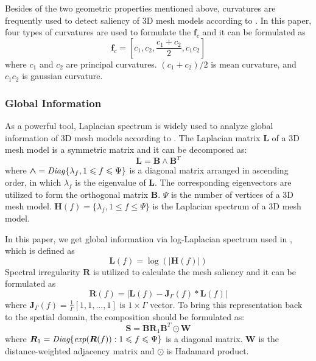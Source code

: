 \documentclass[runningheads]{article}
\begin{document}
Besides of the two geometric properties mentioned above, curvatures \cite{Curvatures} are frequently used to detect saliency of 3D mesh models according to \cite{Meshsaliency2005mesh,akagunduz2009scale,LSP20073d,randomforest20143d,machine3dkeypoint2013machine}. In this paper, four types of curvatures are used to formulate the \emph{$\bm{f}_c$} and it can be formulated as
\begin{equation}
	\bm{f}_c = [c_1,c_2,\frac{c_1+c_2}{2},c_1c_2]
\end{equation}
where \emph{$c_1$} and \emph{$c_2$} are principal curvatures. \emph{$(c_1+c_2)/2$} is mean curvature, and \emph{$c_1c_2$} is gaussian curvature.

\subsubsection{Global Information}
As a powerful tool, Laplacian spectrum is widely used to analyze global information of 3D mesh models according to \cite{hu2009salient,song20133d,song2014mesh,Pauly,Levy:2010:SMP:1837101.1837109,Zhang:2012:VMD:2167076.2167079}. The Laplacian matrix \emph{$\bm{L}$} of a 3D mesh model is a symmetric matrix and it can be decomposed as:
\begin{equation}
\bm{L} = \bm{B \wedge B}^T
\end{equation}
where \emph{$\bm{\wedge} = \text{\emph{Diag}}\{\lambda_f,1\leqslant f \leqslant \Psi\}$} is a diagonal matrix arranged in ascending order, in which \emph{$\lambda_f$} is the eigenvalue of \emph{$\bm{L}$}. The corresponding eigenvectors are utilized to form the orthogonal matrix \emph{$\bm{B}$}. \emph{$\Psi$} is the number of vertices of a 3D mesh model. \emph{$\bm{H}(f) = \{\lambda_f,1\leqslant f \leqslant \Psi\}$} is the Laplacian spectrum of a 3D mesh model.

In this paper, we get global information via log-Laplacian spectrum used in \cite{song2014mesh}, which is defined as
\begin{equation}
	\bm{L}(f) = \log(|\bm{H}(f)|)
\end{equation}
Spectral irregularity \emph{$\bm{R}$} is utilized to calculate the mesh saliency and it can be formulated as 
\begin{equation}
	\bm{R}(f) = |\bm{L}(f)-\bm{J}_\Gamma(f)*\bm{L}(f)|
\end{equation}
where \emph{$\bm{J}_\Gamma(f) = \frac{1}{\Gamma}[1,1,...,1]$} is \emph{$1\times\Gamma$} vector. To bring this representation back to the spatial domain, the composition should be formulated as:
\begin{equation}
	\bm{S} = \bm{B}\bm{R}_1\bm{B}^T\odot \bm{W}
\end{equation}
where \emph{$\bm{R}_1 = \emph{Diag}\{\emph{exp}(\bm{R}(f)):1\leqslant f\leqslant \Psi\}$} is a diagonal matrix. \emph{$\bm{W}$} is the distance-weighted adjacency matrix and \emph{$\odot$} is Hadamard product. 
\end{document}
